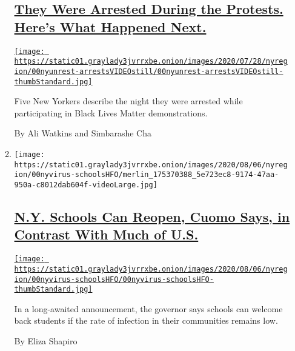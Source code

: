 \begin{enumerate}
\begin{enumerate}
    \hypertarget{they-were-arrested-during-the-protests-heres-what-happened-next}{%
    \subsection{\texorpdfstring{\href{/2020/08/07/nyregion/ny-protest-arrests.html}{They
    Were Arrested During the Protests. Here's What Happened
    Next.}}{They Were Arrested During the Protests. Here's What Happened Next.}}\label{they-were-arrested-during-the-protests-heres-what-happened-next}}

    \href{/2020/08/07/nyregion/ny-protest-arrests.html}{\texttt{[image: https://static01.graylady3jvrrxbe.onion/images/2020/07/28/nyregion/00nyunrest-arrestsVIDEOstill/00nyunrest-arrestsVIDEOstill-thumbStandard.jpg]}}

    Five New Yorkers describe the night they were arrested while
    participating in Black Lives Matter demonstrations.

    By Ali Watkins and Simbarashe Cha
  \item
    \texttt{[image: https://static01.graylady3jvrrxbe.onion/images/2020/08/06/nyregion/00nyvirus-schoolsHFO/merlin\_175370388\_5e723ec8-9174-47aa-950a-c8012dab604f-videoLarge.jpg]}

    \hypertarget{ny-schools-can-reopen-cuomo-says-in-contrast-with-much-of-us}{%
    \subsection{\texorpdfstring{\href{/2020/08/07/nyregion/cuomo-schools-reopening.html}{N.Y.
    Schools Can Reopen, Cuomo Says, in Contrast With Much of
    U.S.}}{N.Y. Schools Can Reopen, Cuomo Says, in Contrast With Much of U.S.}}\label{ny-schools-can-reopen-cuomo-says-in-contrast-with-much-of-us}}

    \href{/2020/08/07/nyregion/cuomo-schools-reopening.html}{\texttt{[image: https://static01.graylady3jvrrxbe.onion/images/2020/08/06/nyregion/00nyvirus-schoolsHFO/00nyvirus-schoolsHFO-thumbStandard.jpg]}}

    In a long-awaited announcement, the governor says schools can
    welcome back students if the rate of infection in their communities
    remains low.

    By Eliza Shapiro
  \end{enumerate}
\end{enumerate}

